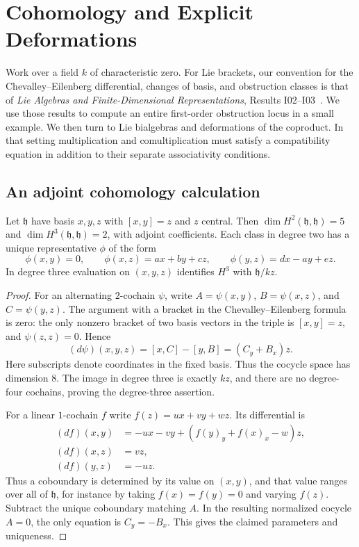 \chapter{Cohomology and Explicit Deformations}

Work over a field \(k\) of characteristic zero. For Lie brackets,
our convention for the Chevalley--Eilenberg differential, changes
of basis, and obstruction classes is that of
\emph{Lie Algebras and Finite-Dimensional Representations},
Results I02--I03~\cite[PDF pp.~56--57]{mg-lie}.
We use those results to compute an entire first-order obstruction
locus in a small example. We then turn to Lie bialgebras and
deformations of the coproduct. In that setting multiplication
and comultiplication must satisfy a compatibility equation
in addition to their separate associativity conditions.

\section{An adjoint cohomology calculation}

\begin{proposition}
\label{res:LD01}
Let \(\mathfrak h\) have basis \(x,y,z\) with
\([x,y]=z\) and \(z\) central. Then
\(\dim H^2(\mathfrak h,\mathfrak h)=5\) and
\(\dim H^3(\mathfrak h,\mathfrak h)=2\), with adjoint
coefficients. Each class in degree two has a unique representative
\(\phi\) of the form
\[
 \phi(x,y)=0,\qquad
 \phi(x,z)=a x+b y+c z,\qquad
 \phi(y,z)=d x-a y+e z .
\]
In degree three evaluation on \((x,y,z)\) identifies
\(H^3\) with \(\mathfrak h/kz\).
\end{proposition}
\begin{proof}
For an alternating \(2\)-cochain \(\psi\), write
\(A=\psi(x,y)\), \(B=\psi(x,z)\), and \(C=\psi(y,z)\).
The argument with a bracket in the Chevalley--Eilenberg
formula is zero: the only nonzero bracket of two basis vectors
in the triple is \([x,y]=z\), and \(\psi(z,z)=0\).
Hence
\[
 (d\psi)(x,y,z)=[x,C]-[y,B]
               =(C_y+B_x)z .
\]
Here subscripts denote coordinates in the fixed basis.
Thus the cocycle space has dimension \(8\). The image in
degree three is exactly \(kz\), and there are no degree-four
cochains, proving the degree-three assertion.

For a linear \(1\)-cochain \(f\) write
\(f(z)=u x+v y+w z\). Its differential is
\[
 \begin{aligned}
 (df)(x,y)&=-u x-v y+(f(y)_y+f(x)_x-w)z,\\
 (df)(x,z)&=v z,\\
 (df)(y,z)&=-u z.
 \end{aligned}
\]
Thus a coboundary is determined by its value on \((x,y)\),
and that value ranges over all of \(\mathfrak h\), for instance
by taking \(f(x)=f(y)=0\) and varying \(f(z)\).
Subtract the unique coboundary matching \(A\). In the resulting
normalized cocycle \(A=0\), the only equation is
\(C_y=-B_x\). This gives the claimed parameters and uniqueness.
\end{proof}

